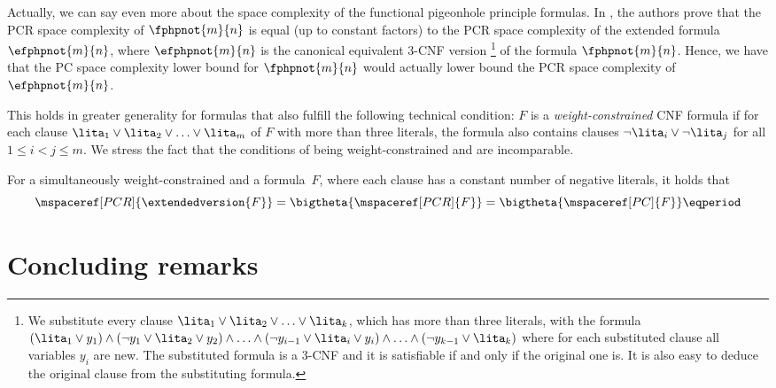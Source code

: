\documentclass{toc}
\begin{document}
%
%
%
%
%
%
%

Actually, we can say even more about the space complexity of the
functional pigeonhole principle formulas. In \cite{FLNRT15SpaceCplx},
the authors prove that the PCR space complexity of $\fphpnot{m}{n}$ is
equal (up to constant factors) to the PCR space complexity of the
extended formula $\efphpnot{m}{n}$, where $\efphpnot{m}{n}$ is the
canonical equivalent $3$-CNF version%
%
\footnote{We substitute every clause $\lita_{1}\lor\lita_{2}\lor \ldots \lor
  \lita_{k}$, which has more than three literals, with the formula
$(\lita_{1}\lor y_{1}) \land
(\lnot{y_{1}}\lor\lita_{2}\lor y_{2})
\land \ldots \land
(\lnot{y_{i-1}}\lor\lita_{i}\lor y_{i})
\land \ldots \land
(\lnot{y_{k-1}}\lor\lita_{k}) $
%
where for each substituted clause all variables $y_{i}$ are new. The
substituted formula is a $3$-CNF and it is satisfiable if and only if
the original one is. It is also easy to deduce the original clause
from the substituting formula.}
%
of the formula $\fphpnot{m}{n}$. Hence, we have that the PC
space complexity lower bound for $\fphpnot{m}{n}$ would actually lower
bound the PCR space complexity of $\efphpnot{m}{n}$.

This holds in greater generality for \varweightconstrained{} formulas
that also fulfill the following technical condition: $F$ is a
\emph{weight-constrained} CNF formula if for each clause $\lita_{1} \lor
\lita_{2} \lor \ldots \lor \lita_{m}$ of $F$ with more than three literals,
the formula also contains clauses $\lnot{\lita_{i}} \lor \lnot{\lita_{j}}$ for
all $1 \leq i < j \leq m$.
%
We stress the fact that the conditions of being weight-constrained and \varweightconstrained{} are incomparable.

\begin{corollary}
  For a simultaneously weight-constrained and a
  \varweightconstrained{} formula~$F$, where each clause has a constant
  number of negative literals, it holds that
  \begin{equation*}
    \mspaceref[PCR]{\extendedversion{F}} = \bigtheta{\mspaceref[PCR]{F}} = \bigtheta{\mspaceref[PC]{F}} \eqperiod
  \end{equation*}
\end{corollary}
 
%

\section{Concluding remarks}
\label{sec:concluding-remarks}
\end{document}
